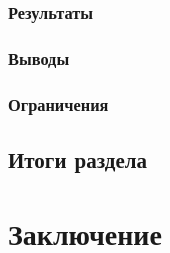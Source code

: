 \documentclass[pdflatex,sn-mathphys-num]{sn-jnl}%
\theoremstyle{thmstyleone}%
\theoremstyle{thmstyletwo}%
\theoremstyle{thmstylethree}%
\begin{document}
\subsubsection{Результаты}

\subsubsection{Выводы}

\subsubsection{Ограничения}

\subsection{Итоги раздела}

\section{Заключение}\label{sec6}

\backmatter
\end{document}
